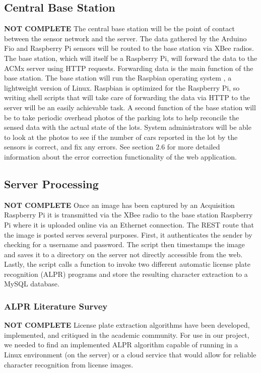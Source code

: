 \documentclass[11pt, oneside, fullpage, doublespace]{article}
\begin{document}
\subsection{Central Base Station}
{\color{red}\textbf{NOT COMPLETE}}
The central base station will be the point of contact between the sensor network and the server. The data gathered by the Arduino Fio and Raspberry Pi sensors will be routed to the base station via XBee radios. The base station, which will itself be a Raspberry Pi, will forward the data to the ACMx server using HTTP requests. Forwarding data is the main function of the base station. The base station will run the Raspbian operating system \cite{raspbian}, a lightweight version of Linux. Raspbian is optimized for the Raspberry Pi, so writing shell scripts that will take care of forwarding the data via HTTP to the server will be an easily achievable task. A second function of the base station will be to take periodic overhead photos of the parking lots to help reconcile the sensed data with the actual state of the lots. System administrators will be able to look at the photos to see if the number of cars reported in the lot by the sensors is correct, and fix any errors. See section 2.6 for more detailed information about the error correction functionality of the web application.


\subsection{Server Processing}
{\color{red}\textbf{NOT COMPLETE}}
Once an image has been captured by an Acquisition Raspberry Pi it is transmitted via the XBee radio to the base station Raspberry Pi where it is uploaded online via an Ethernet connection. The REST route that the image is posted serves several purposes. First, it authenticates the sender by checking for a username and password. The script then timestamps the image and saves it to a directory on the server not directly accessible from the web. Lastly, the script calls a function to invoke two different automatic license plate recognition (ALPR) programs and store the resulting character extraction to a MySQL database.

\subsubsection{ALPR Literature Survey}
{\color{red}\textbf{NOT COMPLETE}}
License plate extraction algorithms have been developed, implemented, and critiqued in the academic community. For use in our project, we needed to find an implemented ALPR algorithm capable of running in a Linux environment (on the server) or a cloud service that would allow for reliable character recognition from license images.
\end{document}
